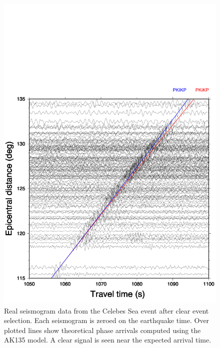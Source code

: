 \documentclass[11pt,a4paper]{article}
\begin{document}
\begin{figure}
	\includegraphics[width=\textwidth]{figures/celebessea_real.pdf}
	\caption{Real seismogram data from the Celebes Sea event after clear event selection. Each seismogram is zeroed on the earthquake time. Over plotted lines show theoretical phase arrivals computed using the AK135 model. A clear signal is seen near the expected arrival time.}
	\label{fig:Real nonaligned}
\end{figure}
\end{document}
